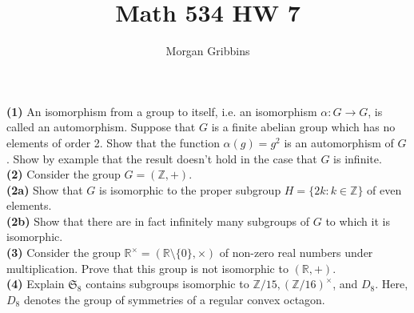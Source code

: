 \documentclass[12pt,letterpaper]{article}
\title{Math 534 HW 7}
\author{Morgan Gribbins}
\date{}
\begin{document}
	
\maketitle

\textbf{(1)} An isomorphism from a group to itself, i.e. an isomorphism \(\alpha: G \to G\), is called an automorphism. Suppose that \(G\) is a finite abelian group which has no elements of order 2. Show that the function \(\alpha(g) = g^{2}\) is an automorphism of \(G\). Show by example that the result doesn't hold in the case that \(G\) is infinite. \\



\textbf{(2)} Consider the group \(G = (\mathbb{Z}, +)\). \\

\textbf{(2a)} Show that \(G\) is isomorphic to the proper subgroup \(H = \{2k : k \in \mathbb{Z}\}\) of even elements. \\



\textbf{(2b)} Show that there are in fact infinitely many subgroups of \(G\) to which it is isomorphic. \\



\textbf{(3)} Consider the group \(\mathbb{R}^{\times} = (\mathbb{R}\setminus \{0\}, \times)\) of non-zero real numbers under multiplication. Prove that this group is not isomorphic to \((\mathbb{R}, +)\). \\



\textbf{(4)} Explain \(\mathfrak{S}_{8}\) contains subgroups isomorphic to \(\mathbb{Z}/15, (\mathbb{Z}/16)^{\times}\), and \(D_{8}\). Here, \(D_{8}\) denotes the group of symmetries of a regular convex octagon. \\ 
\end{document}
